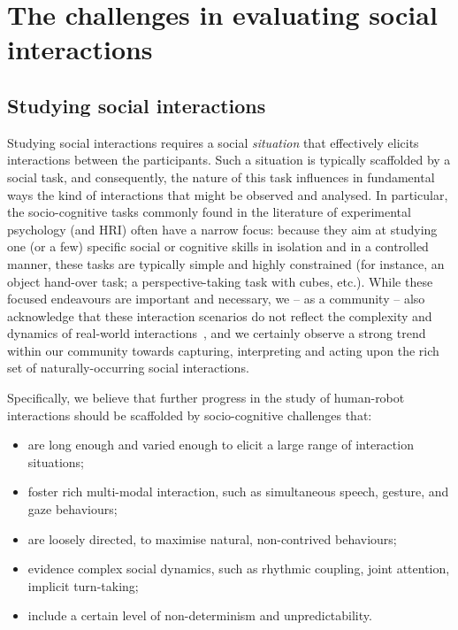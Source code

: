 \documentclass[sigconf]{acmart}
\begin{document}
\section{The challenges in evaluating social interactions}
\label{sec:intro}

\subsection{Studying social interactions}

Studying social interactions requires a social \emph{situation} that
effectively elicits interactions between the participants. Such a situation is
typically scaffolded by a social task, and consequently, the nature of this task
influences in fundamental ways the kind of interactions that might be observed
and analysed. In particular, the socio-cognitive tasks commonly found in the
literature of experimental psychology (and HRI) often have a narrow focus:
because they aim at studying one (or a few) specific social or cognitive skills
in isolation and in a controlled manner, these tasks are typically simple and
highly constrained (for instance, an object hand-over task; a perspective-taking
task with cubes, etc.). While these focused endeavours are important and
necessary, we -- as a community -- also acknowledge that these interaction
scenarios do not reflect the complexity and dynamics of real-world
interactions~\cite{baxter2016characterising}, and we certainly observe a strong
trend within our community towards capturing, interpreting and acting upon the rich set of
naturally-occurring social interactions.

Specifically, we believe that further progress in the study of human-robot
interactions should be scaffolded by socio-cognitive challenges that:

\begin{itemize}
    \item are long enough and varied enough to elicit a large range of
        interaction situations;
    \item foster rich multi-modal interaction, such as simultaneous speech, gesture, and gaze
        behaviours;
    \item are loosely directed, to maximise natural, non-contrived behaviours;
    \item evidence complex social dynamics, such as rhythmic coupling, joint attention,
        implicit turn-taking;
    \item include a certain level of non-determinism and unpredictability.
\end{itemize}
\end{document}
